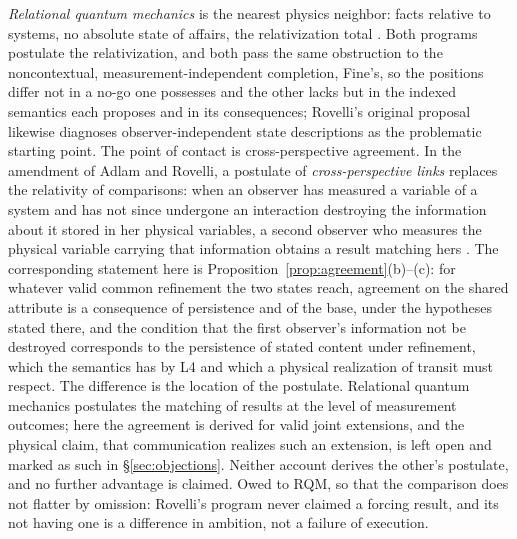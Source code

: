\emph{Relational quantum mechanics} is the nearest physics neighbor: facts relative to systems, no absolute state of affairs, the relativization total \cite{rovelli1996relational}. Both programs postulate the relativization, and both pass the same obstruction to the noncontextual, measurement-independent completion, Fine's, so the positions differ not in a no-go one possesses and the other lacks but in the indexed semantics each proposes and in its consequences; Rovelli's original proposal likewise diagnoses observer-independent state descriptions as the problematic starting point. The point of contact is cross-perspective agreement. In the amendment of Adlam and Rovelli, a postulate of \emph{cross-perspective links} replaces the relativity of comparisons: when an observer has measured a variable of a system and has not since undergone an interaction destroying the information about it stored in her physical variables, a second observer who measures the physical variable carrying that information obtains a result matching hers \cite{adlamrovelli2022}. The corresponding statement here is Proposition~\ref{prop:agreement}(b)--(c): for whatever valid common refinement the two states reach, agreement on the shared attribute is a consequence of persistence and of the base, under the hypotheses stated there, and the condition that the first observer's information not be destroyed corresponds to the persistence of stated content under refinement, which the semantics has by L4 and which a physical realization of transit must respect. The difference is the location of the postulate. Relational quantum mechanics postulates the matching of results at the level of measurement outcomes; here the agreement is derived for valid joint extensions, and the physical claim, that communication realizes such an extension, is left open and marked as such in \S\ref{sec:objections}. Neither account derives the other's postulate, and no further advantage is claimed. Owed to RQM, so that the comparison does not flatter by omission: Rovelli's program never claimed a forcing result, and its not having one is a difference in ambition, not a failure of execution.

